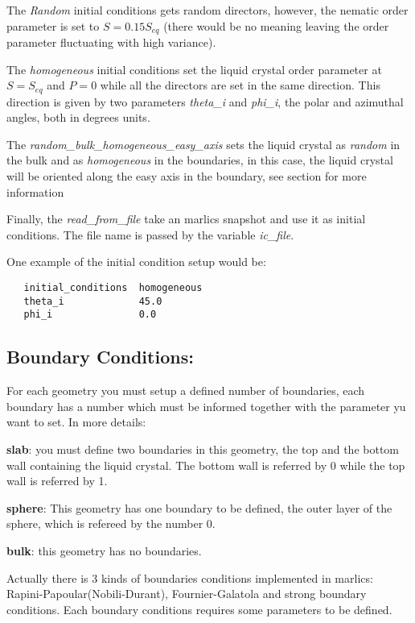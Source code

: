 \documentclass{article}
\begin{document}
The \textit{Random} initial conditions gets random directors, however,
the nematic order parameter is set to $S=0.15 S_{eq}$ (there would be
no meaning leaving the order parameter fluctuating with high
variance).

The \textit{homogeneous} initial conditions set the liquid crystal
order parameter at $S=S_{eq}$ and $P=0$ while all the directors are
set in the same direction. This direction is given by two parameters
\textit{theta_i} and \textit{phi_i}, the polar and azimuthal angles,
both in degrees units.

The \textit{random_bulk_homogeneous_easy_axis} sets the liquid crystal
as \textit{random} in the bulk and as \textit{homogeneous} in the
boundaries, in this case, the liquid crystal will be oriented along
the easy axis in the boundary, see section \label{ssec:boundary} for
more information

Finally, the \textit{read_from_file} take an marlics snapshot and use
it as initial conditions. The file name is passed by the variable
\textit{ic_file}.

One example of the initial condition setup would be:
\begin{lstlisting}
   initial_conditions  homogeneous
   theta_i             45.0
   phi_i               0.0	
\end{lstlisting}


\subsection{Boundary Conditions:}\label{boundary.params}

For each geometry you must setup a defined number of boundaries, each
boundary has a number which must be informed together with the
parameter yu want to set. In more details:

\textbf{slab}: you must define two boundaries in this geometry, the
top and the bottom wall containing the liquid crystal. The bottom wall
is referred by 0 while the top wall is referred by 1.

\textbf{sphere}: This geometry has one boundary to be defined, the
outer layer of the sphere, which is refereed by the number 0.

\textbf{bulk}: this geometry has no boundaries.

Actually there is 3 kinds of boundaries conditions implemented in
marlics: Rapini-Papoular(Nobili-Durant), Fournier-Galatola and strong
boundary conditions. Each boundary conditions requires some parameters
to be defined.
\end{document}
